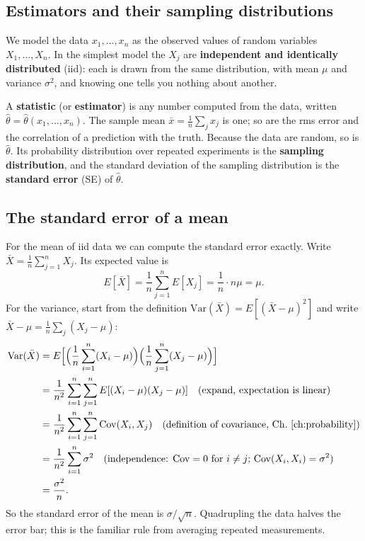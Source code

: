 \subsection{Estimators and their sampling distributions}

We model the data $x_1,\dots,x_n$ as the observed values of random variables $X_1,\dots,X_n$. In the simplest model the $X_j$ are \textbf{independent and identically distributed} (iid): each is drawn from the same distribution, with mean $\mu$ and variance $\sigma^2$, and knowing one tells you nothing about another.

A \textbf{statistic} (or \textbf{estimator}) is any number computed from the data, written $\hat\theta=\hat\theta(x_1,\dots,x_n)$. The sample mean $\bar x=\frac1n\sum_j x_j$ is one; so are the rms error and the correlation of a prediction with the truth. Because the data are random, so is $\hat\theta$. Its probability distribution over repeated experiments is the \textbf{sampling distribution}, and the standard deviation of the sampling distribution is the \textbf{standard error} (SE) of $\hat\theta$.

\subsection{The standard error of a mean}

For the mean of iid data we can compute the standard error exactly. Write $\bar X=\frac1n\sum_{j=1}^n X_j$. Its expected value is
\begin{equation}
E[\bar X]=\frac1n\sum_{j=1}^n E[X_j]=\frac1n\cdot n\mu=\mu .
\label{eq:controls-meanmean}
\end{equation}
For the variance, start from the definition $\mathrm{Var}(\bar X)=E[(\bar X-\mu)^2]$ and write $\bar X-\mu=\frac1n\sum_j(X_j-\mu)$:
\begin{align}
\mathrm{Var}(\bar X)&=E\Big[\Big(\frac1n\sum_{i=1}^n(X_i-\mu)\Big)\Big(\frac1n\sum_{j=1}^n(X_j-\mu)\Big)\Big]\nonumber\\
&=\frac1{n^2}\sum_{i=1}^n\sum_{j=1}^n E[(X_i-\mu)(X_j-\mu)]\quad\text{(expand, expectation is linear)}\nonumber\\
&=\frac1{n^2}\sum_{i=1}^n\sum_{j=1}^n \mathrm{Cov}(X_i,X_j)\quad\text{(definition of covariance, Ch.~\ref{ch:probability})}\nonumber\\
&=\frac1{n^2}\sum_{i=1}^n \sigma^2\quad\text{(independence: $\mathrm{Cov}=0$ for $i\ne j$; $\mathrm{Cov}(X_i,X_i)=\sigma^2$)}\nonumber\\
&=\frac{\sigma^2}{n}.
\label{eq:controls-varmean}
\end{align}
So the standard error of the mean is $\sigma/\sqrt n$. Quadrupling the data halves the error bar; this is the familiar rule from averaging repeated measurements.

